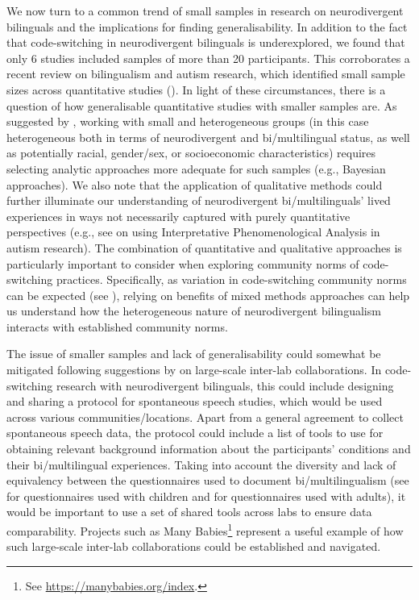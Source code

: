 \documentclass[output=paper]{langscibook}
\begin{document}
We now turn to a common trend of small samples in research on neurodivergent bilinguals and the implications for finding generalisability. In addition to the fact that code-switching in neurodivergent bilinguals is underexplored, we found that only 6 studies included samples of more than 20 participants. This corroborates a recent review on bilingualism and autism research, which identified small sample sizes across quantitative studies (\citealt{PrévostTuller2021}). In light of these circumstances, there is a question of how generalisable quantitative studies with smaller samples are. As suggested by \citet{GirolamoEtAl2023studies}, working with small and heterogeneous groups (in this case heterogeneous both in terms of neurodivergent and bi{\slash}multilingual status, as well as potentially racial, gender/sex, or socioeconomic characteristics) requires selecting analytic approaches more adequate for such samples (e.g., Bayesian approaches). We also note that the application of qualitative methods could further illuminate our understanding of neurodivergent bi/multilinguals’ lived experiences in ways not necessarily captured with purely quantitative perspectives (e.g., see  \citealt{HowardEtAl2019} on using Interpretative Phenomenological Analysis in autism research). The combination of quantitative and qualitative approaches is particularly important to consider when exploring community norms of code-switching practices. Specifically, as variation in code-switching community norms can be expected (see \citealt{Deuchar2020,ParafitaBalamnodate}), relying on benefits of mixed methods approaches can help us understand how the heterogeneous nature of neurodivergent bilingualism interacts with established community norms.

The issue of smaller samples and lack of generalisability could somewhat be mitigated following suggestions by \citet{PrévostTuller2021} on large-scale inter-lab collaborations. In code-switching research with neurodivergent bilinguals, this could include designing and sharing a protocol for spontaneous speech studies, which would be used across various communities/locations. Apart from a general agreement to collect spontaneous speech data, the protocol could include a list of tools to use for obtaining relevant background information about the participants’ conditions and their bi/multilingual experiences. Taking into account the diversity and lack of equivalency between the questionnaires used to document bi/multilingualism (see \citealt{KascelanEtAl2022} for questionnaires used with children and \citealt{DassEtAl2024} for questionnaires used with adults), it would be important to use a set of shared tools across labs to ensure data comparability. Projects such as Many Babies\footnote{See \url{https://manybabies.org/index}.}  represent a useful example of how such large-scale inter-lab collaborations could be established and navigated.
\end{document}
